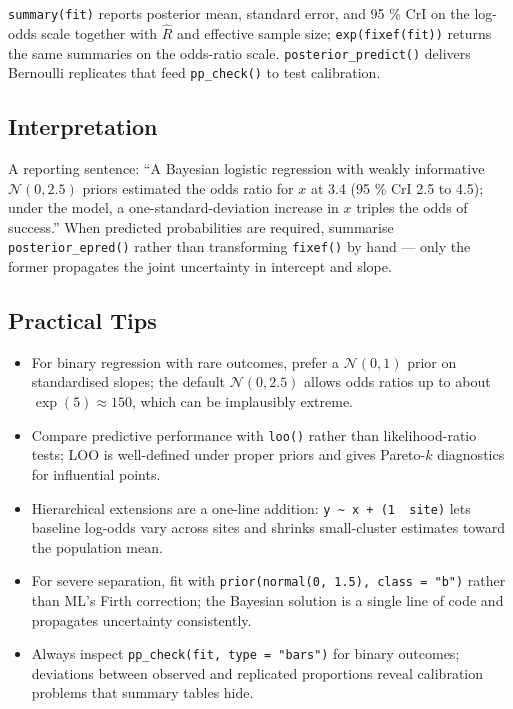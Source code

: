 \documentclass[
]{article}
\providecommand{\tightlist}{%
  \setlength{\itemsep}{0pt}\setlength{\parskip}{0pt}}
\begin{document}
\texttt{summary(fit)} reports posterior mean, standard error, and 95 \%
CrI on the log-odds scale together with \(\hat R\) and effective sample
size; \texttt{exp(fixef(fit))} returns the same summaries on the
odds-ratio scale. \texttt{posterior\_predict()} delivers Bernoulli
replicates that feed \texttt{pp\_check()} to test calibration.

\subsection{Interpretation}\label{interpretation}

A reporting sentence: ``A Bayesian logistic regression with weakly
informative \(\mathcal N(0, 2.5)\) priors estimated the odds ratio for
\(x\) at 3.4 (95 \% CrI 2.5 to 4.5); under the model, a
one-standard-deviation increase in \(x\) triples the odds of success.''
When predicted probabilities are required, summarise
\texttt{posterior\_epred()} rather than transforming \texttt{fixef()} by
hand --- only the former propagates the joint uncertainty in intercept
and slope.

\subsection{Practical Tips}\label{practical-tips}

\begin{itemize}
\tightlist
\item
  For binary regression with rare outcomes, prefer a
  \(\mathcal N(0, 1)\) prior on standardised slopes; the default
  \(\mathcal N(0, 2.5)\) allows odds ratios up to about
  \(\exp(5) \approx 150\), which can be implausibly extreme.
\item
  Compare predictive performance with \texttt{loo()} rather than
  likelihood-ratio tests; LOO is well-defined under proper priors and
  gives Pareto-\(k\) diagnostics for influential points.
\item
  Hierarchical extensions are a one-line addition:
  \texttt{y\ \textasciitilde{}\ x\ +\ (1\ \textbar{}\ site)} lets
  baseline log-odds vary across sites and shrinks small-cluster
  estimates toward the population mean.
\item
  For severe separation, fit with
  \texttt{prior(normal(0,\ 1.5),\ class\ =\ "b")} rather than ML's Firth
  correction; the Bayesian solution is a single line of code and
  propagates uncertainty consistently.
\item
  Always inspect \texttt{pp\_check(fit,\ type\ =\ "bars")} for binary
  outcomes; deviations between observed and replicated proportions
  reveal calibration problems that summary tables hide.
\end{itemize}
\end{document}
